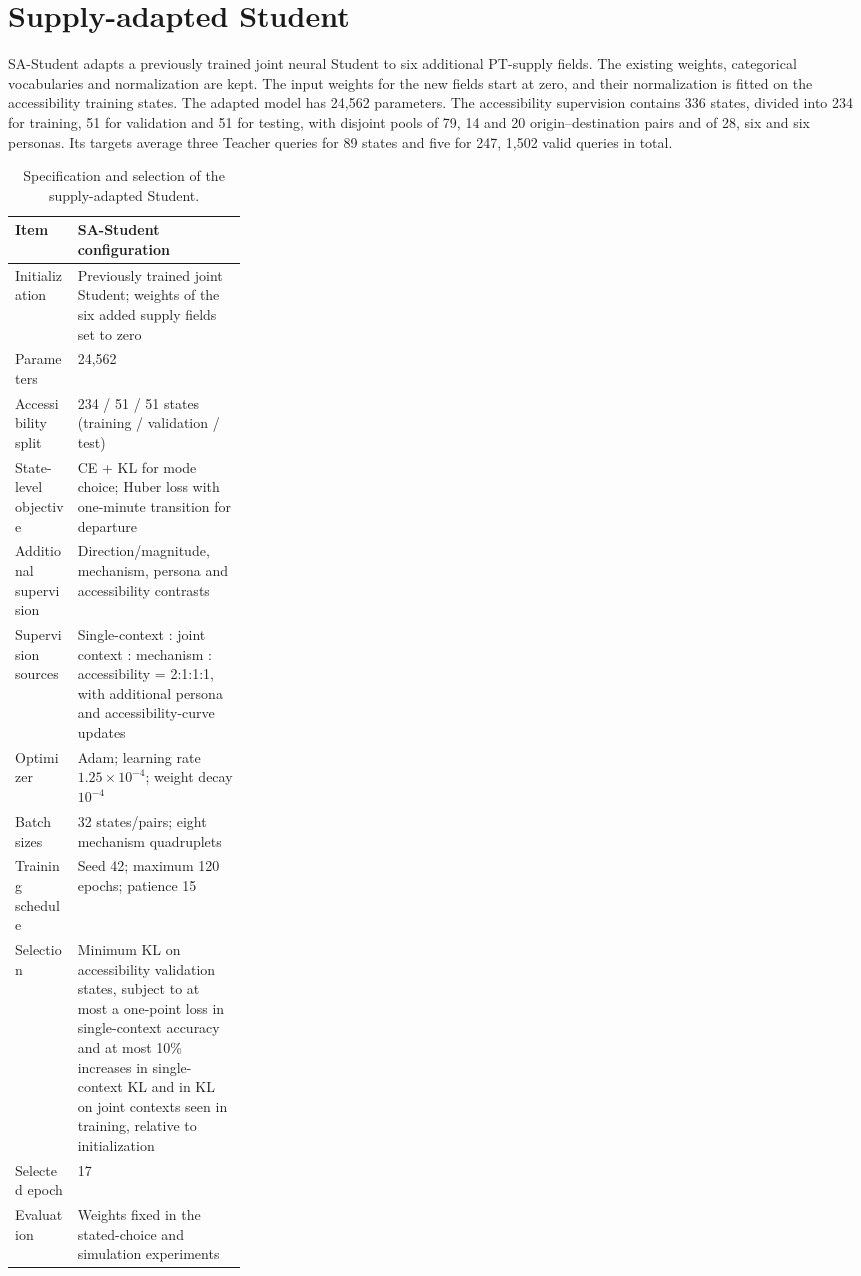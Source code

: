 \section{Supply-adapted Student}
\label{sec:s9_recipe}
SA-Student adapts a previously trained joint neural Student to six additional PT-supply fields. The existing weights, categorical vocabularies and normalization are kept. The input weights for the new fields start at zero, and their normalization is fitted on the accessibility training states. The adapted model has 24,562 parameters. The accessibility supervision contains 336 states, divided into 234 for training, 51 for validation and 51 for testing, with disjoint pools of 79, 14 and 20 origin--destination pairs and of 28, six and six personas. Its targets average three Teacher queries for 89 states and five for 247, 1,502 valid queries in total.

\begin{table}[pos=htbp]
\centering\small
\caption{Specification and selection of the supply-adapted Student.}
\label{tab:s9_spec}
\renewcommand{\arraystretch}{1.14}
\begin{tabularx}{\linewidth}{@{}p{0.27\linewidth}X@{}}
\toprule
Item & SA-Student configuration \\
\midrule
Initialization & Previously trained joint Student; weights of the six added supply fields set to zero \\
Parameters & 24,562 \\
Accessibility split & 234 / 51 / 51 states (training / validation / test) \\
State-level objective & CE + KL for mode choice; Huber loss with one-minute transition for departure \\
Additional supervision & Direction/magnitude, mechanism, persona and accessibility contrasts \\
Supervision sources & Single-context : joint context : mechanism : accessibility = 2:1:1:1, with additional persona and accessibility-curve updates \\
Optimizer & Adam; learning rate $1.25\times10^{-4}$; weight decay $10^{-4}$ \\
Batch sizes & 32 states/pairs; eight mechanism quadruplets \\
Training schedule & Seed 42; maximum 120 epochs; patience 15 \\
Selection & Minimum KL on accessibility validation states, subject to at most a one-point loss in single-context accuracy and at most 10\% increases in single-context KL and in KL on joint contexts seen in training, relative to initialization \\
Selected epoch & 17 \\
Evaluation & Weights fixed in the stated-choice and simulation experiments \\
\bottomrule
\end{tabularx}
\end{table}

